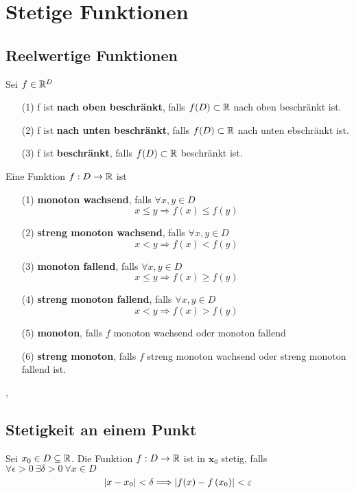 \section{Stetige Funktionen}

\subsection{Reelwertige Funktionen}

\Def[3.1.1] Sei $f \in \mathbb{R}^D$
\begin{enumerate}
\item[(1)] f ist \textbf{nach oben beschränkt}, falls $f(D) \subset \mathbb{R}$ nach oben beschränkt ist.
\item[(2)] f ist \textbf{nach unten beschränkt}, falls $f(D) \subset \mathbb{R}$ nach unten ebschränkt ist.
\item[(3)] f ist \textbf{beschränkt}, falls $f(D) \subset \mathbb{R}$ beschränkt ist.
\end{enumerate}

\Def[3.1.2] Eine Funktion $f: D \rightarrow \mathbb{R}$ ist 
\begin{enumerate}
\item[(1)] \textbf{monoton wachsend}, falls $\forall x, y \in D$
\[
x \leqslant y \Longrightarrow f(x) \leqslant f(y)
\]
\item[(2)] \textbf{streng monoton wachsend}, falls $\forall x, y \in D$
\[
x<y \Longrightarrow f(x)<f(y)
\]
\item[(3)] \textbf{monoton fallend}, falls $\forall x, y \in D$
\[
x \leqslant y \Longrightarrow f(x) \geqslant f(y)
\]
\item[(4)] \textbf{streng monoton fallend}, falls $\forall x, y \in D$
\[
x<y \Longrightarrow f(x)>f(y)
\]
\item[(5)] \textbf{monoton}, falls $f$ monoton wachsend oder monoton fallend
\item[(6)] \textbf{streng monoton}, falls $f$ streng monoton wachsend oder streng monoton fallend ist.
\end{enumerate}

\sep

\subsection{Stetigkeit an einem Punkt}
\Def[3.2.1] Sei $x_{0} \in D \subseteq \mathbb{R}$. Die Funktion $f: D \rightarrow \mathbb{R}$ ist in $\boldsymbol{x}_{0}$ stetig, falls $\forall \epsilon > 0 \ \exists \delta > 0 \ \forall x \in D$
\[ \left\lvert x-x_{0} \right\rvert<\delta \Longrightarrow\left\lvert f(x)-f\left(x_{0}\right) \right\rvert<\varepsilon\]  

